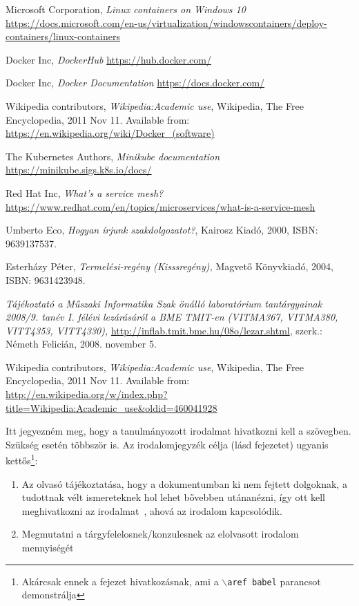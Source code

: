 \documentclass[a4paper,oneside]{article}
\begin{document}
\begin{thebibliography}{9}
\label{sec:tanulm-irod-jegyz}

 Microsoft Corporation, \emph{Linux containers on Windows 10} \\
\url{https://docs.microsoft.com/en-us/virtualization/windowscontainers/deploy-containers/linux-containers}

  Docker Inc, \emph{DockerHub} \url{https://hub.docker.com/}

  Docker Inc, \emph{Docker Documentation} \url{https://docs.docker.com/}

 Wikipedia contributors, \emph{Wikipedia:Academic
    use}, Wikipedia, The Free Encyclopedia, 2011 Nov 11.  Available
  from: \\ \url{https://en.wikipedia.org/wiki/Docker_(software)}

 The Kubernetes Authors, \emph{Minikube documentation} \url{https://minikube.sigs.k8s.io/docs/} 

 Red Hat Inc, \emph{What's a service mesh?} \url{https://www.redhat.com/en/topics/microservices/what-is-a-service-mesh}

 Umberto Eco, \emph{Hogyan írjunk szakdolgozatot?},
  Kairosz Kiadó, 2000, ISBN: 9639137537.

 Esterházy Péter, \emph{Termelési-regény (Kisssregény),}
  Magvető Könyvkiadó, 2004, ISBN: 9631423948.

 \emph{Tájékoztató a Műszaki Informatika Szak önálló
    laboratórium tantárgyainak 2008/9. tanév I. félévi lezárásáról a
    BME TMIT-en (VITMA367, VITMA380, VITT4353, VITT4330),}
  \url{http://inflab.tmit.bme.hu/08o/lezar.shtml}, szerk.: Németh Felicián,
  2008. november 5.

 Wikipedia contributors, \emph{Wikipedia:Academic
    use}, Wikipedia, The Free Encyclopedia, 2011 Nov 11.  Available
  from: \\ \url{http://en.wikipedia.org/w/index.php?title=Wikipedia:Academic\_use\&oldid=460041928}

\end{thebibliography}

Itt jegyezném meg, hogy a tanulmányozott irodalmat hivatkozni kell a
szövegben.  Szükség esetén többször is.  Az irodalomjegyzék célja
(lásd  fejezetet) ugyanis
kettős\footnote{Akárcsak ennek a fejezet hivatkozásnak, ami a
  \texttt{$\backslash$aref babel} parancsot demonstrálja}:
\begin{enumerate}
\item Az olvasó tájékoztatása, hogy a dokumentumban ki nem fejtett
  dolgoknak, a tudottnak vélt ismereteknek hol lehet bővebben
  utánanézni, így ott kell meghivatkozni az irodalmat~\cite{eco,
    esterhazy}, ahová az irodalom kapcsolódik.
\item Megmutatni a tárgyfelelosnek/konzulesnek az elolvasott irodalom
  mennyiségét
\end{enumerate}
\end{document}

